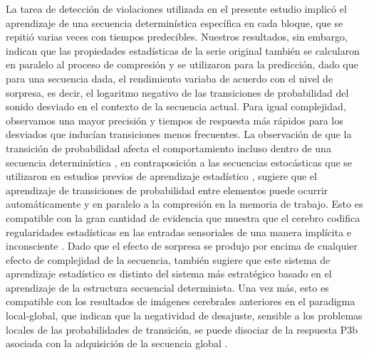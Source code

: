 La tarea de detección de violaciones utilizada en el presente estudio implicó el aprendizaje de una secuencia determinística específica en cada bloque, que se repitió varias veces con tiempos predecibles. Nuestros resultados, sin embargo, indican que las propiedades estadísticas de la serie original también se calcularon en paralelo al proceso de compresión y se utilizaron para la predicción, dado que para una secuencia dada, el rendimiento variaba de acuerdo con el nivel de sorpresa, es decir, el logaritmo negativo de las transiciones de probabilidad del sonido desviado en el contexto de la secuencia actual. Para igual complejidad, observamos una mayor precisión y tiempos de respuesta más rápidos para los desviados que inducían transiciones menos frecuentes. La observación de que la transición de probabilidad afecta el comportamiento incluso dentro de una secuencia determinística \cite{f80}, en contraposición a las secuencias estocásticas que se utilizaron en estudios previos de aprendizaje estadístico \cite{f18,f19,f20,f74,f75,f122}, sugiere que el aprendizaje de transiciones de probabilidad entre elementos puede ocurrir automáticamente y en paralelo a la compresión en la memoria de trabajo. Esto es compatible con la gran cantidad de evidencia que muestra que el cerebro codifica regularidades estadísticas en las entradas sensoriales de una manera implícita e inconsciente \cite{f73,f123,f124,f125,f126}. Dado que el efecto de sorpresa se produjo por encima de cualquier efecto de complejidad de la secuencia, también sugiere que este sistema de aprendizaje estadístico es distinto del sistema más estratégico basado en el aprendizaje de la estructura secuencial determinista. Una vez más, esto es compatible con los resultados de imágenes cerebrales anteriores en el paradigma local-global, que indican que la negatividad de desajuste, sensible a los problemas locales de las probabilidades de transición, se puede disociar de la respuesta P3b asociada con la adquisición de la secuencia global \cite{p67,p68,p72}.


